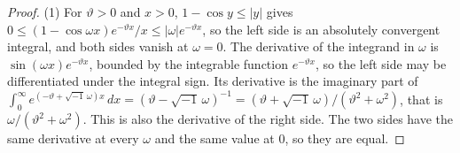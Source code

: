 \begin{proof}
\leanok
(1) For $\vartheta > 0$ and $x > 0$, $1 - \cos y \le |y|$ gives
$0 \le (1 - \cos\omega x)e^{-\vartheta x}/x \le |\omega|e^{-\vartheta x}$, so the left side is an
absolutely convergent integral, and both sides vanish at $\omega = 0$. The derivative of the
integrand in $\omega$ is $\sin(\omega x)e^{-\vartheta x}$, bounded by the integrable function
$e^{-\vartheta x}$, so the left side may be differentiated under the integral sign. Its derivative
is the imaginary part of
$\int_0^\infty e^{(-\vartheta + \sqrt{-1}\,\omega)x}\,dx = (\vartheta - \sqrt{-1}\,\omega)^{-1}
= (\vartheta + \sqrt{-1}\,\omega)/(\vartheta^2 + \omega^2)$, that is $\omega/(\vartheta^2 + \omega^2)$.
This is also the derivative of the right side. The two sides have the same derivative at every
$\omega$ and the same value at $0$, so they are equal.


\end{proof}
